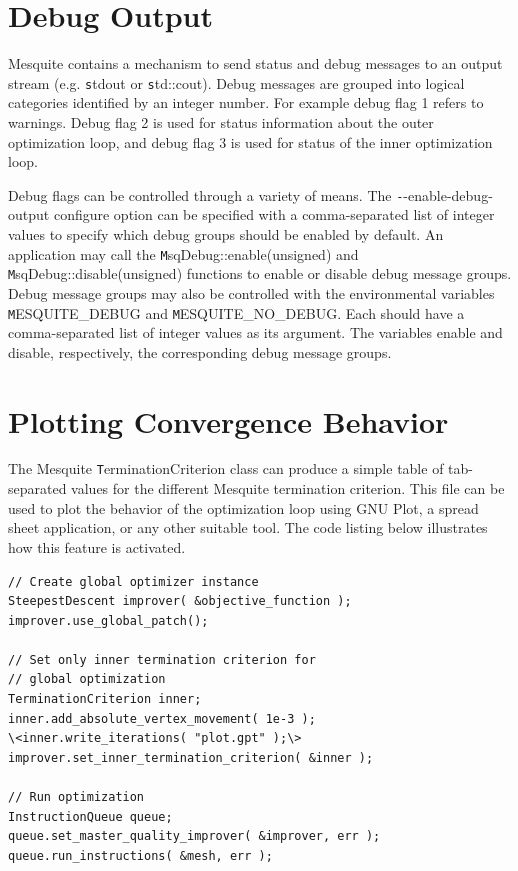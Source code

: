 \section{Debug Output}

Mesquite contains a mechanism to send status and debug messages to an output stream (e.g. {\texttt stdout} or {\texttt std::cout}).  Debug messages are grouped into logical categories identified by an integer number.  For example debug flag 1 refers to warnings.  Debug flag 2 is used for status information about the outer optimization loop, and debug flag 3 is used for status of the inner optimization loop. 

Debug flags can be controlled through a variety of means.  The {\texttt --enable-debug-output} configure option can be specified with a comma-separated list of integer values to specify which debug groups should be enabled by default.  An application may call the {\texttt MsqDebug::enable(unsigned)} and {\texttt MsqDebug::disable(unsigned)} functions to enable or disable debug message groups.  Debug message groups may also be controlled with the environmental variables {\texttt MESQUITE\_DEBUG} and {\texttt MESQUITE\_NO\_DEBUG}.  Each should have a comma-separated list of integer values as its argument.  The variables enable and disable, respectively, the corresponding debug message groups.

\clearpage
\section{Plotting Convergence Behavior \label{sec:optplot}}

The Mesquite {\texttt TerminationCriterion} class can produce a simple table of tab-separated values for the different Mesquite termination criterion.  This file can be used to plot the behavior of the optimization loop using GNU Plot, a spread sheet application, or any other suitable tool.  The code listing below illustrates how this feature is activated.

\begin{lstlisting}[frame=single]
// Create global optimizer instance
SteepestDescent improver( &objective_function );
improver.use_global_patch();

// Set only inner termination criterion for 
// global optimization
TerminationCriterion inner;
inner.add_absolute_vertex_movement( 1e-3 );
\<inner.write_iterations( "plot.gpt" );\>
improver.set_inner_termination_criterion( &inner );

// Run optimization
InstructionQueue queue;
queue.set_master_quality_improver( &improver, err );
queue.run_instructions( &mesh, err );
\end{lstlisting}

